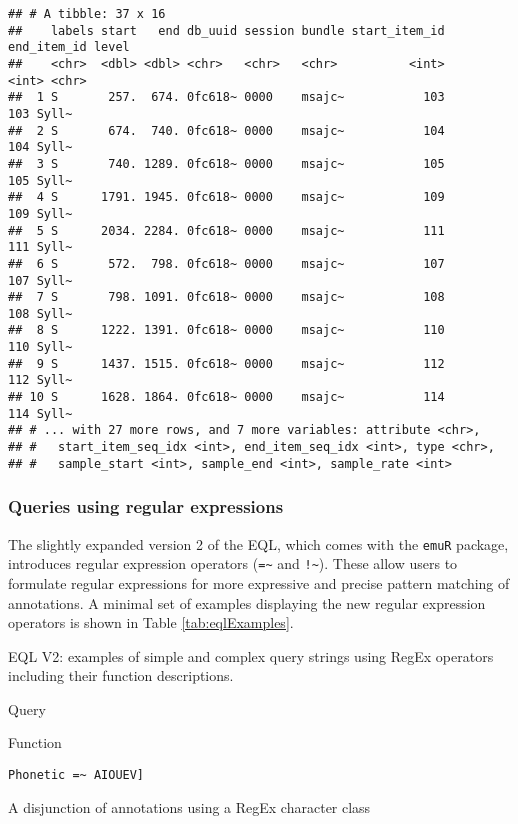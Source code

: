 \documentclass[
]{book}
\begin{document}
\begin{verbatim}
## # A tibble: 37 x 16
##    labels start   end db_uuid session bundle start_item_id end_item_id level
##    <chr>  <dbl> <dbl> <chr>   <chr>   <chr>          <int>       <int> <chr>
##  1 S       257.  674. 0fc618~ 0000    msajc~           103         103 Syll~
##  2 S       674.  740. 0fc618~ 0000    msajc~           104         104 Syll~
##  3 S       740. 1289. 0fc618~ 0000    msajc~           105         105 Syll~
##  4 S      1791. 1945. 0fc618~ 0000    msajc~           109         109 Syll~
##  5 S      2034. 2284. 0fc618~ 0000    msajc~           111         111 Syll~
##  6 S       572.  798. 0fc618~ 0000    msajc~           107         107 Syll~
##  7 S       798. 1091. 0fc618~ 0000    msajc~           108         108 Syll~
##  8 S      1222. 1391. 0fc618~ 0000    msajc~           110         110 Syll~
##  9 S      1437. 1515. 0fc618~ 0000    msajc~           112         112 Syll~
## 10 S      1628. 1864. 0fc618~ 0000    msajc~           114         114 Syll~
## # ... with 27 more rows, and 7 more variables: attribute <chr>,
## #   start_item_seq_idx <int>, end_item_seq_idx <int>, type <chr>,
## #   sample_start <int>, sample_end <int>, sample_rate <int>
\end{verbatim}

\hypertarget{queries-using-regular-expressions}{%
\subsubsection{Queries using regular expressions}\label{queries-using-regular-expressions}}

The slightly expanded version 2 of the EQL, which comes with the \texttt{emuR} package, introduces regular expression operators (\texttt{=\textasciitilde{}} and \texttt{!\textasciitilde{}}). These allow users to formulate regular expressions for more expressive and precise pattern matching of annotations. A minimal set of examples displaying the new regular expression operators is shown in Table \ref{tab:eqlExamples}.

\label{tab:eqlExamples}EQL V2: examples of simple and complex query strings using RegEx operators including their function descriptions.

Query

Function

\texttt{Phonetic\ =\textasciitilde{}\ \textquotesingle{}{[}AIOUEV{]}\textquotesingle{}}

A disjunction of annotations using a RegEx character class
\end{document}
